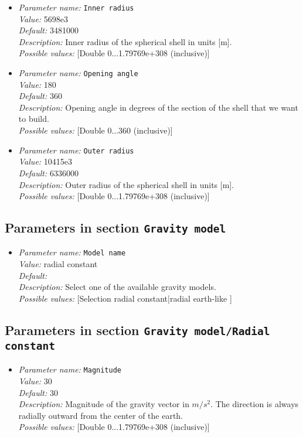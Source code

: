 \begin{itemize}
\item {\it Parameter name:} {\tt Inner radius}\\
{\it Value:} 5698e3\\
{\it Default:} 3481000\\
{\it Description:} Inner radius of the spherical shell in units [m].\\
{\it Possible values:} [Double 0...1.79769e+308 (inclusive)]
\item {\it Parameter name:} {\tt Opening angle}\\
{\it Value:} 180\\
{\it Default:} 360\\
{\it Description:} Opening angle in degrees of the section of the shell that we want to build.\\
{\it Possible values:} [Double 0...360 (inclusive)]
\item {\it Parameter name:} {\tt Outer radius}\\
{\it Value:} 10415e3\\
{\it Default:} 6336000\\
{\it Description:} Outer radius of the spherical shell in units [m].\\
{\it Possible values:} [Double 0...1.79769e+308 (inclusive)]
\end{itemize}

\subsection{Parameters in section \tt Gravity model}

\begin{itemize}
\item {\it Parameter name:} {\tt Model name}\\
{\it Value:} radial constant\\
{\it Default:} \\
{\it Description:} Select one of the available gravity models.\\
{\it Possible values:} [Selection radial constant|radial earth-like ]
\end{itemize}



\subsection{Parameters in section \tt Gravity model/Radial constant}

\begin{itemize}
\item {\it Parameter name:} {\tt Magnitude}\\
{\it Value:} 30\\
{\it Default:} 30\\
{\it Description:} Magnitude of the gravity vector in $m/s^2$. The direction is always radially outward from the center of the earth.\\
{\it Possible values:} [Double 0...1.79769e+308 (inclusive)]
\end{itemize}

